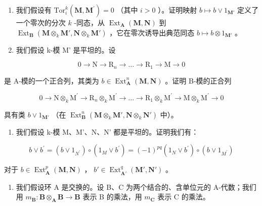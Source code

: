 \begin{enumerate}
\def\labelenumi{\alph{enumi})}
\item
  我们假设有 \(\mathrm{Tor}_{i}^{k}(\mathbf{M},\mathbf{M}^{\prime}) = 0\) （其中 \(i > 0\) ）。证明映射 \(b\mapsto b\vee 1_{\mathbf{M}'}\) 定义了一个零次的分次 \(k\) -同态，从 \(\operatorname{Ext}_{\mathbf{A}}(\mathbf{M},\mathbf{N})\) 到 \(\operatorname{Ext}_{\mathbf{B}}(\mathbf{M}\otimes_{k}\mathbf{M}',\mathbf{N}\otimes_{k}\mathbf{M}')\) ，它在零次诱导出典范同态 \(b\mapsto b\otimes 1_{\mathbf{M}'}\) 。
\item
  我们假设 k-模 M' 是平坦的。设
\end{enumerate}

\[
0 \rightarrow \mathrm{N} \rightarrow \mathrm{R} _ {n} \rightarrow \dots \rightarrow \mathrm{R} _ {1} \rightarrow \mathrm{M} \rightarrow 0
\]

是 A-模的一个正合列，其类为 \(b \in \operatorname{Ext}_{\mathbf{A}}^{n}(\mathbf{M}, \mathbf{N})\) 。证明 B-模的正合列

\[
0 \rightarrow \mathrm{N} \otimes_ {k} \mathrm{M} ^ {\prime} \rightarrow \mathrm{R} _ {n} \otimes_ {k} \mathrm{M} ^ {\prime} \rightarrow \dots \rightarrow \mathrm{R} _ {1} \otimes_ {k} \mathrm{M} ^ {\prime} \rightarrow \mathrm{M} \otimes_ {k} \mathrm{M} ^ {\prime} \rightarrow 0
\]

具有类 \(b \vee 1_{\mathbf{M}'}\) （在 \(\operatorname{Ext}_{\mathbf{B}}^{n}(\mathbf{M} \otimes_{k} \mathbf{M}', \mathbf{N} \otimes_{k} \mathbf{N}')\) 中）。

\begin{enumerate}
\def\labelenumi{\alph{enumi})}
\setcounter{enumi}{2}
\tightlist
\item
  我们假设 k-模 M、M'、N、N' 都是平坦的。证明我们有：
\end{enumerate}

\[
b \vee b ^ {\prime} = (b \vee 1 _ {N ^ {\prime}}) \circ (1 _ {M} \vee b ^ {\prime}) = (- 1) ^ {p q} (1 _ {N} \vee b ^ {\prime}) \circ (b \vee 1 _ {M ^ {\prime}})
\]

对于 \(b \in \operatorname{Ext}_{\mathbf{A}}^{p}(\mathbf{M}, \mathbf{N})\) ， \(b' \in \operatorname{Ext}_{\mathbf{A}'}^{q}(\mathbf{M}', \mathbf{N}')\) 。

\begin{enumerate}
\def\labelenumi{\arabic{enumi})}
\setcounter{enumi}{8}
\tightlist
\item
  我们假设环 A 是交换的。设 B、C 为两个结合的、含单位元的 A-代数；我们用 \(m_{\mathbf{B}}: \mathbf{B} \otimes_{\mathbf{A}} \mathbf{B} \to \mathbf{B}\) 表示 B 的乘法，用 \(m_{\mathbf{C}}\) 表示 C 的乘法。
\end{enumerate}

